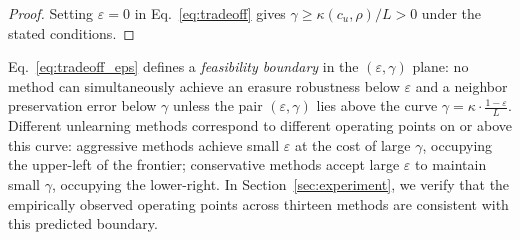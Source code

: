 \begin{proof}
Setting $\varepsilon = 0$ in Eq.~\eqref{eq:tradeoff} gives 
$\gamma \geq \kappa(c_u,\rho)/L > 0$
under the stated conditions.
\end{proof}

Eq.~\eqref{eq:tradeoff_eps} defines a \emph{feasibility boundary} in the $(\varepsilon, \gamma)$ plane: no method can simultaneously achieve an erasure robustness below $\varepsilon$ and a neighbor preservation error below $\gamma$ unless the pair $(\varepsilon, \gamma)$ lies above the curve
$\gamma = \kappa \cdot \frac{1-\varepsilon}{L}.$
Different unlearning methods correspond to different operating points on or above this curve: aggressive methods achieve small $\varepsilon$ at the cost of large $\gamma$, occupying the upper-left of the frontier; conservative methods accept large $\varepsilon$ to maintain small $\gamma$, occupying the lower-right.
In Section~\ref{sec:experiment}, we verify that the empirically observed operating points across thirteen methods are consistent with this predicted boundary.







